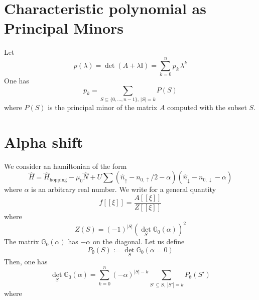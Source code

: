 \documentclass{article}
\begin{document}
\section{Characteristic polynomial as Principal Minors}
Let
\begin{equation}\label{}
 p(\lambda)= \det\left(A+\lambda \mathbb{I} \right)=\sum_{k=0}^n p_k\,\lambda^k
\end{equation}
One has
\begin{equation}\label{}
p_k=\sum_{S\subseteq\{0,\dots,n-1\},\,|S|=k} P(S)
\end{equation}
where $P(S)$ is the principal minor of the matrix $A$ computed with the subset $S$. 
\section{Alpha shift}
We consider an hamiltonian of the form
\begin{equation}\label{}
  \hat{H}=\hat{H}_{\text{hopping}}
  -\mu_0\hat{N}
  +U\sum
  \left(\hat{n}_\uparrow-n_{0,\uparrow}/2-\alpha\right)
  \left(\hat{n}_\downarrow-n_{0,\downarrow}-\alpha\right)
\end{equation}
where $\alpha$ is an arbitrary real number. We write for a general quantity
\begin{equation}\label{}
f[[\xi]]=\frac{A[[\xi]]}{Z[[\xi]]}
\end{equation}
where
\begin{equation}\label{}
Z(S) = (-1)^{|S|}\left(\det_S \mathbb{G}_0(\alpha)\right)^2
\end{equation}
The matrix $\mathbb{G}_0(\alpha)$ has $-\alpha$ on the diagonal.
Let us define
\begin{equation}\label{}
P_{\emptyset}(S) := \det_S \mathbb{G}_0(\alpha=0)
\end{equation}
Then, one has
\begin{equation}\label{}
\det_S \mathbb{G}_0(\alpha)   = \sum_{k=0}^n (-\alpha)^{|S|-k}\sum_{S'\subseteq S,\,|S'|=k}P_{\emptyset}(S')
\end{equation}
where
\end{document}

